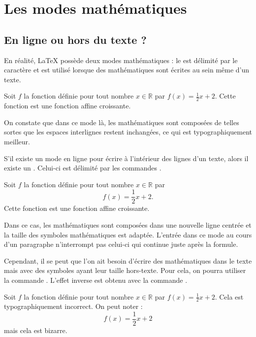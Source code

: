 \section{Les modes mathématiques}
\subsection{En ligne ou hors du texte ?}

En réalité, \LaTeX{} possède deux modes mathématiques : le  est délimité par le caractère \ordi{\$} et est utilisé lorsque des mathématiques sont écrites au sein même d'un texte.\bigskip

{\NewFont
\begin{SideBySideExample}
    Soit $f$ la fonction d\'efinie pour tout nombre
    $x \in \mathds R$ par $f(x) = \frac 12 x + 2$.
    Cette fonction est une fonction affine croissante.
\end{SideBySideExample}
}\bigskip

On constate que dans ce mode là, les mathématiques sont composées de telles sortes que les espaces interlignes restent inchangées, ce qui est typographiquement meilleur.\medskip

S'il existe un mode en ligne pour écrire à l'intérieur des lignes d'un texte, alors il existe un . Celui-ci est délimité par les commandes \NomCom [ et \NomCom ].\bigskip

{\NewFont
\begin{SideBySideExample}
    Soit $f$ la fonction d\'efinie pour tout nombre
    $x \in \mathds R$ par \[f(x) = \frac 12 x + 2.\]
    Cette fonction est une fonction affine croissante.
\end{SideBySideExample}
}\bigskip

Dans ce cas, les mathématiques sont composées dans une nouvelle ligne centrée et la taille des symboles mathématiques est adaptée. L'entrée dans ce mode au cours d'un paragraphe n'interrompt pas celui-ci qui continue juste après la formule.

Cependant, il se peut que l'on ait besoin d'écrire des mathématiques dans le texte mais avec des symboles ayant leur taille hors-texte. Pour cela, on pourra utiliser la commande . L'effet inverse est obtenu avec la commande .\bigskip

{\NewFont
\begin{SideBySideExample}
    Soit $f$ la fonction d\'efinie pour tout nombre
    $x \in \mathds R$ par
    $\displaystyle{f(x) = \frac 12 x + 2}$.
    Cela est typographiquement incorrect. On peut noter :
    \[\textstyle{f(x) = \frac 12 x + 2}\]
    mais cela est bizarre.
\end{SideBySideExample}
}\bigskip

